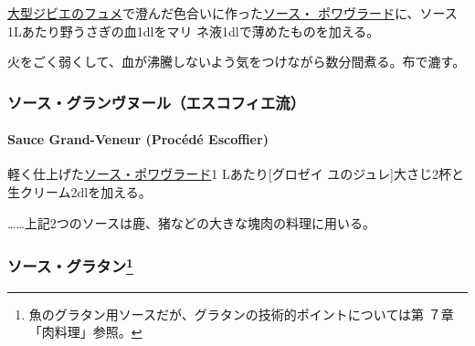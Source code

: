 \begin{recette}
 

\protect\hyperlink{fonds-de-gibier}{大型ジビエのフュメ}で澄んだ色合いに作った\protect\hyperlink{sauce-poivrade}{ソース・
ポワヴラード}に、ソース1Lあたり野うさぎの血1dlをマリ
ネ液1dlで薄めたものを加える。

火をごく弱くして、血が沸騰しないよう気をつけながら数分間煮る。布で漉す。

\maeaki

\hypertarget{ux30bdux30fcux30b9ux30b0ux30e9ux30f3ux30f4ux30ccux30fcux30ebux30a8ux30b9ux30b3ux30d5ux30a3ux30a8ux6d41}{%
\subsubsection{ソース・グランヴヌール（エスコフィエ流）}\label{ux30bdux30fcux30b9ux30b0ux30e9ux30f3ux30f4ux30ccux30fcux30ebux30a8ux30b9ux30b3ux30d5ux30a3ux30a8ux6d41}}

\hypertarget{sauce-grand-veneur-procede-escoffier}{%
\paragraph{Sauce Grand-Veneur (Procédé
Escoffier)}\label{sauce-grand-veneur-procede-escoffier}}

  

軽く仕上げた\protect\hyperlink{sauce-poivrade}{ソース・ポワヴラード}1
Lあたり{[}グロゼイ
ユのジュレ{]}大さじ2杯と生クリーム2\undemi{}dlを加える。

\ldots{}\ldots{}上記2つのソースは鹿、猪などの大きな塊肉の料理に用いる。

\maeaki

\hypertarget{ux30bdux30fcux30b9ux30b0ux30e9ux30bfux30f345}{%
\subsubsection[ソース・グラタン]{\texorpdfstring{ソース・グラタン\footnote{魚のグラタン用ソースだが、グラタンの技術的ポイントについては第
  ７章「肉料理」参照。}}{ソース・グラタン}}\label{ux30bdux30fcux30b9ux30b0ux30e9ux30bfux30f345}}


\end{recette}
